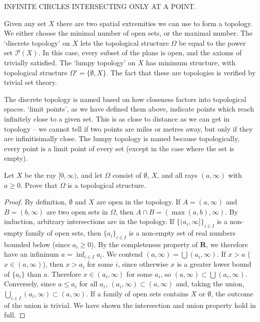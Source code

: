 INFINITE CIRCLES INTERSECTING ONLY AT A POINT.

Given any set $X$ there are two spatial extremities we can use to form a topology. We either choose the minimal number of open sets, or the maximal number. The `discrete topology' on $X$ lets the topological structure $\Omega$ be equal to the power set $\mathcal{P}(X)$. In this case, every subset of the plane is open, and the axioms of trivially satisfied. The `lumpy topology' on $X$ has minimum structure, with topological structure $\Omega' = \{\emptyset, X\}$. The fact that these are topologies is verified by trivial set theory.

The discrete topology is named based on how closeness factors into topological spaces. `limit points', as we have defined them above, indicate points which reach infinitely close to a given set. This is as close to distance as we can get in topology -- we cannot tell if two points are miles or metres away, but only if they are infinitisimally close. The lumpy topology is named because topologically, every point is a limit point of every set (except in the case where the set is empty).

\begin{exercise}
    Let $X$ be the ray $[0,\infty)$, and let $\Omega$ consist of $\emptyset$, $X$, and all rays $(a,\infty)$ with $a \geq 0$. Prove that $\Omega$ is a topological structure.
\end{exercise}
\begin{proof}
    By definition, $\emptyset$ and $X$ are open in the topology. If $A = (a, \infty)$ and $B = (b, \infty)$ are two open sets in $\Omega$, then $A \cap B = (\max(a,b), \infty)$. By induction, arbitrary intersections are in the topology. If $\{(a_i, \infty]\}_{i \in I}$ is a non-empty family of open sets, then $\{a_i\}_{i \in I}$ is a non-empty set of real numbers bounded below (since $a_i \geq 0$). By the completeness property of $\mathbf{R}$, we therefore have an infininum $a = \inf_{i \in I} a_i$. We contend $(a, \infty) = \bigcup (a_i, \infty)$. If $x > a$ ($x \in (a,\infty)$), then $x > a_i$ for some $i$, since otherwise $x$ is a greater lower bound of $\{a_i\}$ than $a$. Therefore $x \in (a_i, \infty)$ for some $a_i$, so $(a,\infty) \subset \bigcup (a_i,\infty)$. Conversely, since $a \leq a_i$ for all $a_i$, $(a_i,\infty) \subset (a, \infty)$ and, taking the union, $\bigcup_{i \in I} (a_i, \infty) \subset (a, \infty)$. If a family of open sets contains $X$ or $\emptyset$, the outcome of the union is trivial. We have shown the intersection and union property hold in full.
\end{proof}

